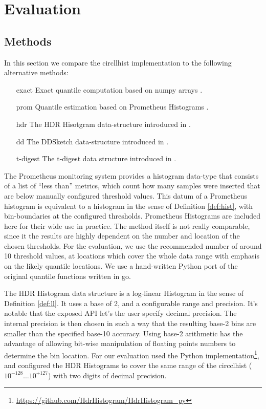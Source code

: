 \documentclass{article}
\theoremstyle{plain}
\theoremstyle{remark}
\begin{document}
\section{Evaluation}
\label{sec:eval}

\subsection{Methods}

In this section we compare the circllhist implementation to the following alternative methods:

\begin{itemize}
\item[exact] Exact quantile computation based on numpy arrays \cite{numpy}.
\item[prom] Quantile estimation based on Prometheus Histograms \cite{prom}.
\item[hdr] The HDR Hisotgram data-structure introduced in \cite{hdr}.
\item[dd] The DDSketch data-structure introduced in \cite{dd}.
\item[t-digest] The t-digest data structure introduced in \cite{tdigest}.
\end{itemize}

The Prometheus monitoring system provides a histogram data-type that consists of a list of ``less
than'' metrics, which count how many samples were inserted that are below manually configured
threshold values. This datum of a Prometheus histogram is equivalent to a histogram in the sense of
Definition \ref{def:hist}, with bin-boundaries at the configured thresholds.  Prometheus Histograms
are included here for their wide use in practice.  The method itself is not really comparable, since
it the results are highly dependent on the number and location of the chosen thresholds. For the
evaluation, we use the recommended number of around 10 threshold values, at locations which cover
the whole data range with emphasis on the likely quantile locations.  We use a hand-written Python
port of the original quantile functions written in go.

The HDR Histogram data structure is a log-linear Histogram in the sense of Definition \ref{def:ll}.
It uses a base of 2, and a configurable range and precision.  It's notable that the exposed API
let's the user specify decimal precision.  The internal precision is then chosen in such a way that
the resulting base-2 bins are smaller than the specified base-10 accuracy.  Using base-2 arithmetic
has the advantage of allowing bit-wise manipulation of floating points numbers to determine the bin
location. For our evaluation used the Python
implementation\footnote{\url{https://github.com/HdrHistogram/HdrHistogram_py}}, and configured the
HDR Histograms to cover the same range of the circclhist ($10^{-128}\dots10^{+127}$) with two digits
of decimal precision.
\end{document}

